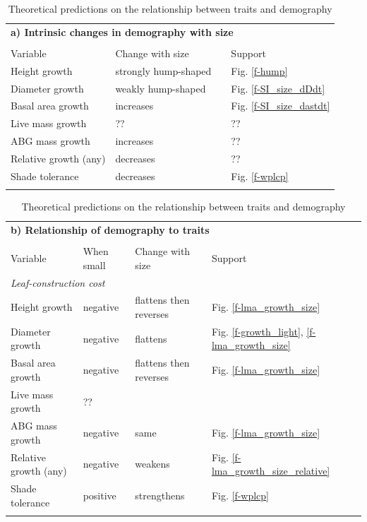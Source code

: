 \documentclass[12pt, a4paper]{article}
\begin{document}
\begin{table}[h]
\caption{Theoretical predictions on the relationship between traits and demography}

{\footnotesize
\centering
\begin{tabular}{p{4cm}p{4cm}p{2cm}p{6cm}}
\\
\multicolumn{4}{l}{\textbf{a) Intrinsic changes in demography with size}} \\ \\
\hline
Variable & Change with size & & Support \\ \hline
Height growth & strongly hump-shaped & & Fig. \ref{f-hump} \\
Diameter growth & weakly hump-shaped & & Fig. \ref{f-SI_size_dDdt}\\
Basal area growth & increases & & Fig. \ref{f-SI_size_dastdt}\\
Live mass growth & ?? & & ?? \\
ABG mass growth & increases & & ??\\
Relative growth (any) & decreases & & ??\\
Shade tolerance & decreases & & Fig. \ref{f-wplcp}\\ \\
\end{tabular}

\begin{tabular}{p{4cm}p{2.5cm}p{3.5cm}p{6cm}}
\multicolumn{4}{l}{\textbf{b) Relationship of demography to traits}} \\ \\
\hline
Variable & When small & Change with size & Support \\ \hline
\multicolumn{4}{l}{\emph{Leaf-construction cost}} \\

Height growth & negative & flattens then reverses  & Fig. \ref{f-lma_growth_size}\\
Diameter growth & negative & flattens & Fig. \ref{f-growth_light}, \ref{f-lma_growth_size}\\
Basal area growth & negative & flattens then reverses & Fig. \ref{f-lma_growth_size}\\
Live mass growth & ??  & & \\
ABG mass growth & negative & same & Fig. \ref{f-lma_growth_size} \\
Relative growth (any) & negative & weakens & Fig. \ref{f-lma_growth_size_relative}\\
Shade tolerance & positive &  strengthens & Fig. \ref{f-wplcp}\\ \\


\end{tabular}}
\end{table}
\end{document}
